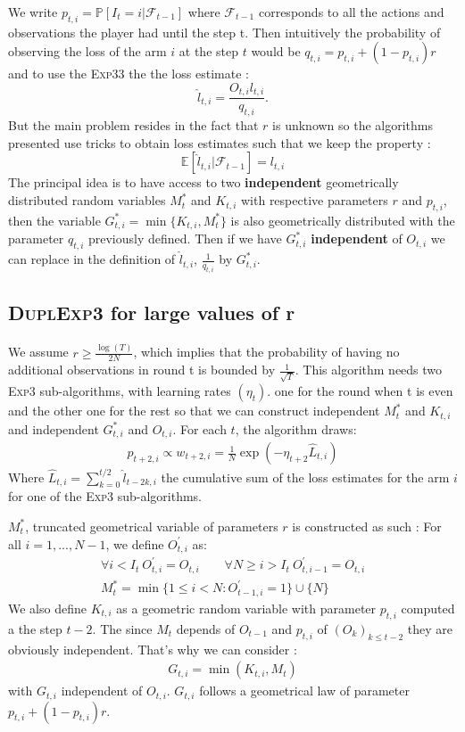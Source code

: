 \documentclass[11pt,a4paper]{article}
\begin{document}
We write $p_{t,i}=\mathbb{P}[I_t=i|\mathcal{F}_{t-1}]$ where $\mathcal{F}_{t-1}$ corresponds to all the actions and observations the player had until the step t. Then intuitively the probability of observing the loss of the arm $i$ at the step $t$ would be $q_{t,i}=p_{t,i} + (1-p_{t,i})r$ and to use the \textsc{Exp3}$3$
the the loss estimate :
\[
\hat{l}_{t,i}=\frac{O_{t,i}l_{t,i}}{q_{t,i}}.
\]
But the main problem resides in the fact that $r$ is unknown so the algorithms presented use tricks to obtain loss estimates such that we keep the property :
\[
\mathbb{E}[\hat{l}_{t,i}|\mathcal{F}_{t-1}]=l_{t,i}
\]
The principal idea is to have access to two \textbf{independent} geometrically distributed random variables $M_t^*$ and $K_{t,i}$ with respective parameters $r$ and $p_{t,i}$, then the variable $G_{t,i}^*=\min\{K_{t,i},M_t^*\}$ is also geometrically distributed with the parameter $q_{t,i}$ previously defined. Then if we have $G_{t,i}^*$ \textbf{independent} of $O_{t,i}$ we can replace in the definition of $\hat{l}_{t,i}$, $\frac{1}{q_{t,i}}$ by $G_{t,i}^*$.

\subsection{\textsc{DuplExp3} for large values of r}
\paragraph{}We assume $ r\geq \frac{\log(T)}{2N}$, which implies that the probability of having no additional observations in round t is bounded by $\frac{1}{\sqrt{T}}$.\newline
This algorithm needs two \textsc{Exp3} sub-algorithms, with learning rates $\left(\eta_t\right)$. one for the round when t is even and the other one for the rest so that we can construct independent $M_t^*$ and $K_{t,i}$ and independent $G_{t,i}^*$ and $O_{t,i}$.
For each $t$, the algorithm draws:
\begin{align*}
p_{t+2,i}\propto w_{t+2,i}= \frac{1}{N} \exp\left( -\eta_{t+2} \hat{L}_{t,i} \right)
\end{align*}
Where $\hat{L}_{t,i}=\sum_{k=0}^{t/2} \hat{l}_{t-2k,i}$ the cumulative sum of the loss estimates for the arm $i$ for one of the \textsc{Exp3} sub-algorithms.

$M_t^*$, truncated geometrical variable of parameters $r$ is constructed as such : 
For all $i=1,...,N-1$, we define $O_{t,i}^{'}$ as:
\begin{align*}
\forall i<I_{t}\ O_{t,i}^{'}=O_{t,i} \qquad \forall N\geq i>I_{t}\ O_{t,i-1}^{'}=O_{t,i} \\
M_t^* =\min\{1\leq i<N: O_{t-1,i}^{'} =1\}\cup\{N\}
\end{align*}
We also define $K_{t,i}$ as a geometric random variable with parameter $p_{t,i}$ computed a the step $t-2$. The since $M_t$ depends of $O_{t-1}$ and $p_{t,i}$ of $\left(O_k\right)_{k\leq t-2}$ they are obviously independent. That's why we can consider :
\begin{align*}
	G_{t,i}=\min\left(K_{t,i},M_t\right)
\end{align*}
with $G_{t,i}$ independent of $O_{t,i}$. $G_{t,i}$ follows a geometrical law of parameter $p_{t,i}+(1-p_{t,i})r$.
\end{document}
